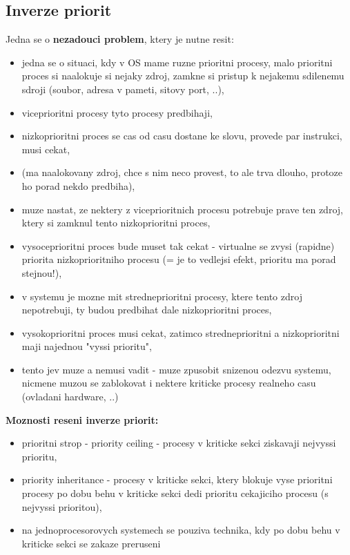 \documentclass[a4paper, 11pt]{article}
\begin{document}
\subsection{Inverze priorit}
Jedna se o \textbf{nezadouci problem}, ktery je nutne resit:
\begin{itemize}
    \item jedna se o situaci, kdy v OS mame ruzne prioritni procesy, malo prioritni proces si naalokuje si nejaky zdroj, zamkne si pristup k nejakemu sdilenemu sdroji (soubor, adresa v pameti, sitovy port, ..),
    \item viceprioritni procesy tyto procesy predbihaji, 
    \item nizkoprioritni proces se cas od casu dostane ke slovu, provede par instrukci, musi cekat,
    \item (ma naalokovany zdroj, chce s nim neco provest, to ale trva dlouho, protoze ho porad nekdo predbiha),
    \item muze nastat, ze nektery z viceprioritnich procesu potrebuje prave ten zdroj, ktery si zamknul tento nizkoprioritni proces,
    \item vysoceprioritni proces bude muset tak cekat - virtualne se zvysi (rapidne) priorita nizkoprioritniho procesu (= je to vedlejsi efekt, prioritu ma porad stejnou!),
    \item v systemu je mozne mit stredneprioritni procesy, ktere tento zdroj nepotrebuji, ty budou predbihat dale nizkoprioritni proces,
    \item vysokoprioritni proces musi cekat, zatimco stredneprioritni a nizkoprioritni maji najednou "vyssi prioritu",
    \item tento jev muze a nemusi vadit - muze zpusobit snizenou odezvu systemu, nicmene muzou se zablokovat i nektere kriticke procesy realneho casu (ovladani hardware, ..) \\
\end{itemize}

\textbf{Moznosti reseni inverze priorit:}
\begin{itemize}
    \item prioritni strop - priority ceiling - procesy v kriticke sekci ziskavaji nejvyssi prioritu,
    \item priority inheritance - procesy v kriticke sekci, ktery blokuje vyse prioritni procesy po dobu behu v kriticke sekci dedi prioritu cekajiciho procesu (s nejvyssi prioritou),
    \item na jednoprocesorovych systemech se pouziva technika, kdy po dobu behu v kriticke sekci se zakaze preruseni \\
\end{itemize}
\end{document}
